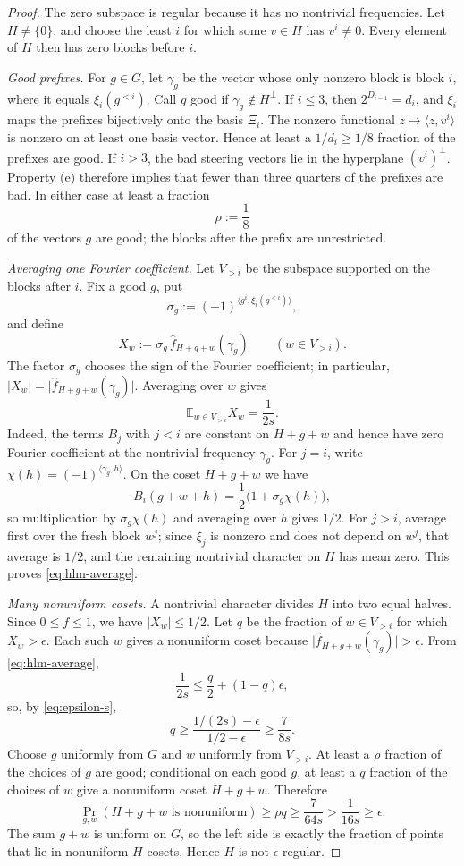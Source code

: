 \documentclass[11pt]{article}
\theoremstyle{plain}
\theoremstyle{definition}
\numberwithin{theorem}{section}
\newcommand{\inner}[2]{\langle #1,#2\rangle}
\newcommand{\abs}[1]{\lvert #1\rvert}
\newcommand{\Xii}{\Xi}
\begin{document}
\begin{proof}
The zero subspace is regular because it has no nontrivial frequencies.  Let
$H\ne\{0\}$, and choose the least $i$ for which some $v\in H$ has
$v^i\ne0$.  Every element of $H$ then has zero blocks before $i$.

\smallskip\noindent\emph{Good prefixes.}
For $g\in G$, let $\gamma_g$ be the vector whose only nonzero block is block
$i$, where it equals $\xi_i(g^{<i})$. Call $g$ good if
$\gamma_g\notin H^\perp$. If $i\le3$, then $2^{D_{i-1}}=d_i$, and $\xi_i$ maps the prefixes
bijectively onto the basis $\Xii_i$.  The nonzero functional
$z\mapsto\inner{z}{v^i}$ is nonzero on at least one basis vector.  Hence at
least a $1/d_i\ge1/8$ fraction of the prefixes are good.  If $i>3$, the bad
steering vectors lie in the hyperplane
$(v^i)^\perp$. Property (e) therefore implies that fewer than three quarters
of the prefixes are bad. In either case at least a fraction
\[
  \rho:=\frac18
\]
of the vectors $g$ are good; the blocks after the prefix are unrestricted.

\smallskip\noindent\emph{Averaging one Fourier coefficient.}
Let $V_{>i}$ be the subspace supported on the blocks after $i$.  Fix a good
$g$, put
\[
  \sigma_g:=(-1)^{\inner{g^i}{\xi_i(g^{<i})}},
\]
and define
\[
  X_w:=\sigma_g\,\widehat f_{H+g+w}(\gamma_g)\qquad(w\in V_{>i}).
\]
The factor $\sigma_g$ chooses the sign of the Fourier coefficient; in
particular, $\abs{X_w}=\abs{\widehat f_{H+g+w}(\gamma_g)}$. Averaging over $w$
gives
\begin{equation}\label{eq:hlm-average}
  \mathbb E_{w\in V_{>i}}X_w=\frac1{2s}.
\end{equation}
Indeed, the terms $B_j$ with $j<i$ are constant on $H+g+w$ and hence have
zero Fourier coefficient at the nontrivial frequency $\gamma_g$. For $j=i$,
write $\chi(h)=(-1)^{\inner{\gamma_g}{h}}$. On the coset $H+g+w$ we have
\[
  B_i(g+w+h)=\frac12\bigl(1+\sigma_g\chi(h)\bigr),
\]
so multiplication by $\sigma_g\chi(h)$ and averaging over $h$ gives $1/2$.
For $j>i$, average first over the fresh block $w^j$; since $\xi_j$ is nonzero
and does not depend on $w^j$, that average is $1/2$, and the remaining
nontrivial character on $H$ has mean zero. This proves
\eqref{eq:hlm-average}.

\smallskip\noindent\emph{Many nonuniform cosets.}
A nontrivial character divides $H$ into two equal halves.  Since $0\le f\le1$,
we have $\abs{X_w}\le1/2$.  Let $q$ be the fraction of $w\in V_{>i}$ for
which $X_w>\epsilon$. Each such $w$ gives a nonuniform coset because
$\abs{\widehat f_{H+g+w}(\gamma_g)}>\epsilon$. From
\eqref{eq:hlm-average},
\[
  \frac1{2s}\le \frac q2+(1-q)\epsilon,
\]
so, by \eqref{eq:epsilon-s},
\[
  q\ge\frac{1/(2s)-\epsilon}{1/2-\epsilon}
  \ge\frac7{8s}.
\]
Choose $g$ uniformly from $G$ and $w$ uniformly from $V_{>i}$.  At least a
$\rho$ fraction of the choices of $g$ are good; conditional on each good
$g$, at least a $q$ fraction of the choices of $w$ give a nonuniform coset
$H+g+w$.  Therefore
\[
  \Pr_{g,w}(H+g+w\text{ is nonuniform})
  \ge\rho q\ge\frac7{64s}>\frac1{16s}\ge\epsilon.
\]
The sum $g+w$ is uniform on $G$, so the left side is exactly the fraction of
points that lie in nonuniform $H$-cosets.  Hence $H$ is not
$\epsilon$-regular.


\end{proof}
\end{document}
